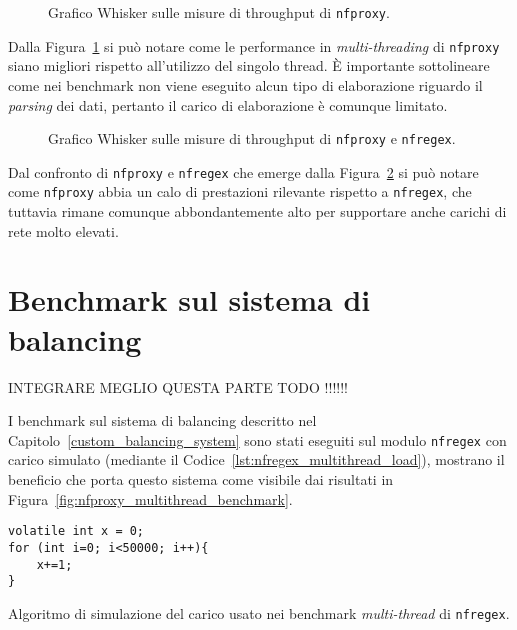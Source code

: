 \begin{figure}[H]
    \centering
    
    \caption{Grafico Whisker sulle misure di throughput di \texttt{nfproxy}.}\label{fig:wisker_nfproxy}
\end{figure}

Dalla Figura~\ref{fig:wisker_nfproxy} si può notare come le performance in \textit{multi-threading} di \texttt{\gls{nfproxy}} siano migliori rispetto all'utilizzo del singolo thread. È importante sottolineare come nei benchmark non viene eseguito alcun tipo di elaborazione riguardo il \textit{parsing} dei dati, pertanto il carico di elaborazione è comunque limitato.

\begin{figure}[H]
    \centering
    
    \caption{Grafico Whisker sulle misure di throughput di \texttt{nfproxy} e \texttt{nfregex}.}\label{fig:wisker_nfproxy_nfregex}
\end{figure}

Dal confronto di \texttt{\gls{nfproxy}} e \texttt{\gls{nfregex}} che emerge dalla Figura~\ref{fig:wisker_nfproxy_nfregex} si può notare come \texttt{\gls{nfproxy}} abbia un calo di prestazioni rilevante rispetto a \texttt{\gls{nfregex}}, che tuttavia rimane comunque abbondantemente alto per supportare anche carichi di rete molto elevati.

\section{Benchmark sul sistema di balancing}\label{balancing_benchmark}

INTEGRARE MEGLIO QUESTA PARTE TODO !!!!!!

I benchmark sul sistema di balancing descritto nel Capitolo~\ref{custom_balancing_system} sono stati eseguiti sul modulo \texttt{\gls{nfregex}} con carico simulato (mediante il Codice~\ref{lst:nfregex_multithread_load}), mostrano il beneficio che porta questo sistema come visibile dai risultati in Figura~\ref{fig:nfproxy_multithread_benchmark}.

\begin{listing}[H]
\begin{verbatim}
volatile int x = 0;
for (int i=0; i<50000; i++){
    x+=1;
}
\end{verbatim}
\vspace{-1em}
\caption{Algoritmo di simulazione del carico usato nei benchmark \textit{multi-thread} di \texttt{nfregex}.}\label{lst:nfregex_multithread_load}
\end{listing}

